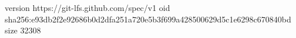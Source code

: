 version https://git-lfs.github.com/spec/v1
oid sha256:e93db2f2e92686b0d2dfa251a720e5b3f699a428500629d5c1e6298c670840bd
size 32308
